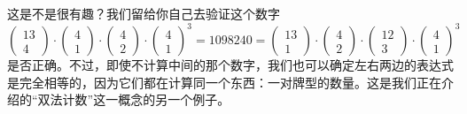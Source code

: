 \begin{example}[一对]
    这是不是很有趣？我们留给你自己去验证这个数字
    \[\begin{pmatrix}
            13 \\
            4
        \end{pmatrix} \cdot \begin{pmatrix}
            4 \\
            1
        \end{pmatrix} \cdot \begin{pmatrix}
            4 \\
            2
        \end{pmatrix} \cdot \begin{pmatrix}
            4 \\
            1
        \end{pmatrix}^3 =  1098240 = \begin{pmatrix}
            13 \\
            1
        \end{pmatrix} \cdot \begin{pmatrix}
            4 \\
            2
        \end{pmatrix} \cdot \begin{pmatrix}
            12 \\
            3
        \end{pmatrix} \cdot \begin{pmatrix}
            4 \\
            1
        \end{pmatrix}^3\]
    是否正确。不过，即使不计算中间的那个数字，我们也可以确定左右两边的表达式是完全相等的，因为它们都在计算同一个东西：一对牌型的数量。这是我们正在介绍的``双法计数''这一概念的另一个例子。
\end{example}

